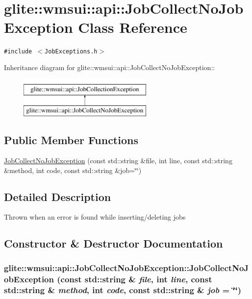 \hypertarget{classglite_1_1wmsui_1_1api_1_1JobCollectNoJobException}{
\section{glite::wmsui::api::Job\-Collect\-No\-Job\-Exception Class Reference}
\label{classglite_1_1wmsui_1_1api_1_1JobCollectNoJobException}
}
{\tt \#include $<$Job\-Exceptions.h$>$}

Inheritance diagram for glite::wmsui::api::Job\-Collect\-No\-Job\-Exception::\begin{figure}[H]
\begin{center}
\leavevmode
\includegraphics[height=2cm]{classglite_1_1wmsui_1_1api_1_1JobCollectNoJobException}
\end{center}
\end{figure}
\subsection*{Public Member Functions}
\begin{CompactItemize}
\item 
\hyperlink{classglite_1_1wmsui_1_1api_1_1JobCollectNoJobException_a0}{Job\-Collect\-No\-Job\-Exception} (const std::string \&file, int line, const std::string \&method, int code, const std::string \&job=\char`\"{}\char`\"{})
\end{CompactItemize}


\subsection{Detailed Description}
Thrown when an error is found while inserting/deleting jobs 



\subsection{Constructor \& Destructor Documentation}
\hypertarget{classglite_1_1wmsui_1_1api_1_1JobCollectNoJobException_a0}{
\subsubsection[JobCollectNoJobException]{\setlength{\rightskip}{0pt plus 5cm}glite::wmsui::api::Job\-Collect\-No\-Job\-Exception::Job\-Collect\-No\-Job\-Exception (const std::string \& {\em file}, int {\em line}, const std::string \& {\em method}, int {\em code}, const std::string \& {\em job} = \char`\"{}\char`\"{})}}
\label{classglite_1_1wmsui_1_1api_1_1JobCollectNoJobException_a0}


